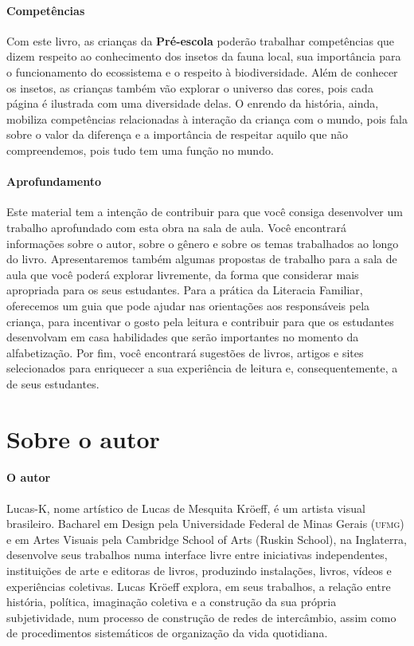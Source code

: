 \documentclass[11pt]{extarticle}
\begin{document}
\paragraph{Competências} 
Com este livro, as crianças da \textbf{Pré-escola} poderão
trabalhar competências que dizem respeito ao conhecimento dos
insetos da fauna local, sua importância para o funcionamento do ecossistema e o respeito à biodiversidade. Além de conhecer os insetos, as crianças também vão explorar o universo das cores, pois cada página é ilustrada com uma diversidade delas. O enrendo da história, ainda, mobiliza competências relacionadas à interação da criança com o mundo, pois fala sobre o valor da diferença e a importância de respeitar aquilo que não compreendemos, pois tudo tem uma função no mundo.

\paragraph{Aprofundamento} 
Este material tem a intenção de contribuir para que você consiga desenvolver um trabalho aprofundado 
com esta obra na sala de aula. Você encontrará informações sobre o autor, sobre 
o gênero e sobre os temas trabalhados ao longo do livro. Apresentaremos também 
algumas propostas de trabalho para a sala de aula que você poderá explorar livremente, 
da forma que considerar mais apropriada para os seus estudantes. Para a prática 
da Literacia Familiar, oferecemos um guia que pode ajudar nas orientações aos 
responsáveis pela criança, para incentivar o gosto pela leitura e contribuir para 
que os estudantes desenvolvam em casa habilidades que serão importantes no momento 
da alfabetização. Por fim, você encontrará sugestões de livros, artigos e sites 
selecionados para enriquecer a sua experiência de leitura e, 
consequentemente, a de seus estudantes.


\section{Sobre o autor}

\paragraph{O autor} Lucas-K, nome artístico de Lucas de Mesquita Kröeff, é um artista visual brasileiro. Bacharel em Design pela Universidade Federal de Minas Gerais (\textsc{ufmg}) e em Artes Visuais pela Cambridge School of Arts (Ruskin School), na Inglaterra, desenvolve seus trabalhos numa interface livre entre iniciativas independentes, instituições de arte e editoras de livros, produzindo instalações, livros, vídeos e experiências coletivas.
Lucas Kröeff explora, em seus trabalhos, a relação entre história, política, imaginação coletiva e a construção da sua própria subjetividade, num processo de construção de redes de intercâmbio, assim como de procedimentos sistemáticos de organização da vida quotidiana.
\end{document}
